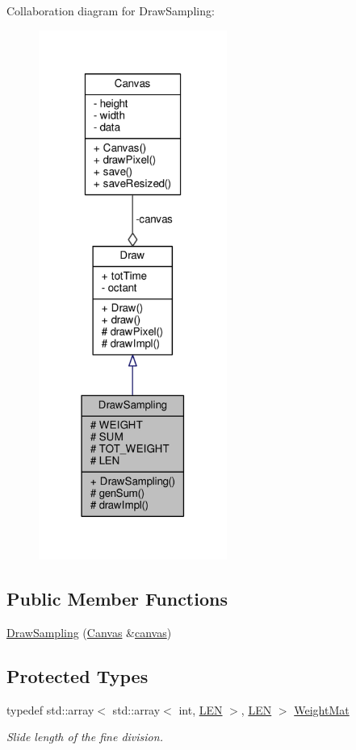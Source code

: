 Collaboration diagram for Draw\+Sampling\+:
\nopagebreak
\begin{figure}[H]
\begin{center}
\leavevmode
\includegraphics[width=175pt]{classDrawSampling__coll__graph}
\end{center}
\end{figure}
\subsection*{Public Member Functions}
\begin{DoxyCompactItemize}
\item 
\hyperlink{classDrawSampling_aa02ae6778de2385b7451f62f1e03cb1e}{Draw\+Sampling} (\hyperlink{classCanvas}{Canvas} \&\hyperlink{classDraw_a72ed77716d9eb7068414f0e4e00753bd}{canvas})
\end{DoxyCompactItemize}
\subsection*{Protected Types}
\begin{DoxyCompactItemize}
\item 
typedef std\+::array$<$ std\+::array$<$ int, \hyperlink{classDrawSampling_a65a0b2e1d234d93049c4807d32fd009d}{L\+EN} $>$, \hyperlink{classDrawSampling_a65a0b2e1d234d93049c4807d32fd009d}{L\+EN} $>$ \hyperlink{classDrawSampling_a73c5d308c9d35c89746810be84e6834d}{Weight\+Mat}
\begin{DoxyCompactList}\small\item\em Slide length of the fine division. \end{DoxyCompactList}\end{DoxyCompactItemize}
